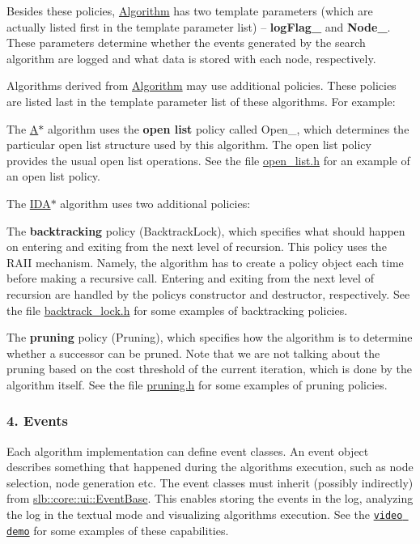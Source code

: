 Besides these policies, \hyperlink{structslb_1_1ext_1_1algorithm_1_1Algorithm}{Algorithm} has two template parameters (which are actually listed first in the template parameter list) -- {\bfseries log\+Flag\+\_\+} and {\bfseries Node\+\_\+}. These parameters determine whether the events generated by the search algorithm are logged and what data is stored with each node, respectively.

Algorithms derived from \hyperlink{structslb_1_1ext_1_1algorithm_1_1Algorithm}{Algorithm} may use additional policies. These policies are listed last in the template parameter list of these algorithms. For example\+:


\begin{DoxyItemize}
\item The \hyperlink{structslb_1_1ext_1_1algorithm_1_1Astar}{A$\ast$} algorithm uses the {\bfseries open list} policy called {\ttfamily Open\+\_\+}, which determines the particular open list structure used by this algorithm. The open list policy provides the usual open list operations. See the file \hyperlink{open__list_8h}{open\+\_\+list.\+h} for an example of an open list policy.
\item The \hyperlink{structslb_1_1ext_1_1algorithm_1_1IdAstar}{I\+D\+A$\ast$} algorithm uses two additional policies\+:
\begin{DoxyItemize}
\item The {\bfseries backtracking} policy ({\ttfamily Backtrack\+Lock}), which specifies what should happen on entering and exiting from the next level of recursion. This policy uses the R\+A\+II mechanism. Namely, the algorithm has to create a policy object each time before making a recursive call. Entering and exiting from the next level of recursion are handled by the policy\textquotesingle{}s constructor and destructor, respectively. See the file \hyperlink{backtrack__lock_8h}{backtrack\+\_\+lock.\+h} for some examples of backtracking policies.
\item The {\bfseries pruning} policy ({\ttfamily Pruning}), which specifies how the algorithm is to determine whether a successor can be pruned. Note that we are not talking about the pruning based on the cost threshold of the current iteration, which is done by the algorithm itself. See the file \hyperlink{pruning_8h}{pruning.\+h} for some examples of pruning policies.
\end{DoxyItemize}
\end{DoxyItemize}\hypertarget{index_s-events}{}\subsubsection{4. Events}\label{index_s-events}
Each algorithm implementation can define event classes. An event object describes something that happened during the algorithm\textquotesingle{}s execution, such as node selection, node generation etc. The event classes must inherit (possibly indirectly) from \hyperlink{structslb_1_1core_1_1ui_1_1EventBase}{slb\+::core\+::ui\+::\+Event\+Base}. This enables storing the events in the log, analyzing the log in the textual mode and visualizing algorithm\textquotesingle{}s execution. See the \href{https://youtu.be/cElxLWve1Zw}{\tt video demo} for some examples of these capabilities.


